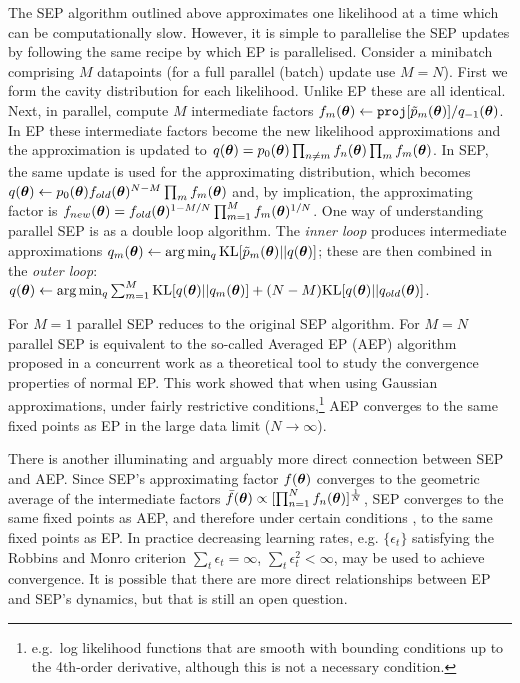 The SEP algorithm outlined above approximates one likelihood at a time which can be computationally slow. However, it is simple to parallelise the SEP updates by following the same recipe by which EP is parallelised. Consider a minibatch comprising $M$ datapoints (for a full parallel (batch) update use $M=N$). First we form the cavity distribution for each likelihood. Unlike EP these are all identical. Next, in parallel, compute $M$ intermediate factors $f_m(\bm{\theta}) \leftarrow \mathtt{proj}[\tilde{p}_m(\bm{\theta})] / q_{-1}(\bm{\theta})$. In EP these intermediate factors become the new likelihood approximations and the approximation is updated to $q(\bm{\theta}) = p_0(\bm{\theta}) \prod_{n \ne m} f_n(\bm{\theta}) \prod_{m} f_m(\bm{\theta}) $. In SEP, the same update is used for the approximating distribution, which becomes $q(\bm{\theta}) \leftarrow p_0(\bm{\theta}) f_{old}(\bm{\theta})^{N-M} \prod_{m} f_m(\bm{\theta}) $ and, by implication, the approximating factor is $f_{new}(\bm{\theta}) = f_{old}(\bm{\theta})^{1-M/N} \prod_{m=1}^M f_m(\bm{\theta})^{1/N}$. One way of understanding parallel SEP is as a double loop algorithm. The \emph{inner loop} produces intermediate approximations  $q_m(\bm{\theta}) \leftarrow \arg\min_q \mathrm{KL}[\tilde{p}_m(\bm{\theta}) ||q(\bm{\theta})]$; these are then combined in the \emph{outer loop}: $q(\bm{\theta}) \leftarrow \arg\min_q \sum_{m=1}^M \mathrm{KL}[q(\bm{\theta}) ||q_m(\bm{\theta})] + (N-M) \mathrm{KL}[q(\bm{\theta}) || q_{old}(\bm{\theta})]$.
%

For $M=1$ parallel SEP reduces to the original SEP algorithm. For $M=N$ parallel SEP is equivalent to the so-called Averaged EP (AEP) algorithm proposed in a concurrent work \citep{dehaene:aep2015,dehaene:aep2018} as a theoretical tool to study the convergence properties of normal EP. This work showed that when using Gaussian approximations, under fairly restrictive conditions,\footnote{e.g.~log likelihood functions that are smooth with bounding conditions up to the 4th-order derivative, although this is not a necessary condition.} AEP converges to the same fixed points as EP in the large data limit ($N \rightarrow \infty$).

There is another illuminating and arguably more direct connection between SEP and AEP. Since SEP's approximating factor $f(\bm{\theta})$ converges to the geometric average of the intermediate factors $\bar{f}(\bm{\theta}) \propto [\prod_{n=1}^N f_n(\bm{\theta})]^{\frac{1}{N}}$, SEP converges to the same fixed points as AEP, and therefore under certain conditions \citep{dehaene:aep2015,dehaene:aep2018}, to the same fixed points as EP. In practice decreasing learning rates, e.g. $\{\epsilon_t\}$ satisfying the Robbins and Monro criterion \citep{robbins:stochastic1951} $\sum_t \epsilon_t = \infty$, $\sum_t \epsilon_t^2 < \infty$, may be used to achieve convergence.
%
It is possible that there are more direct relationships between EP and SEP's dynamics, but that is still an open question.


